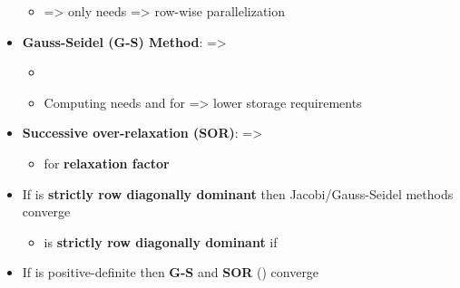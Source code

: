 \begin{itemize}
  \begin{itemize}
  
  \item
    =\textgreater{}  only needs
    =\textgreater{} row-wise parallelization
  \end{itemize}
\item
  \textbf{Gauss-Seidel (G-S) Method}: 
  =\textgreater{}

  \begin{itemize}
  
  \item
  \item
    Computing  needs
     and
     for  =\textgreater{}
    lower storage requirements
  \end{itemize}
\item
  \textbf{Successive over-relaxation (SOR)}:
   =\textgreater{}

  \begin{itemize}
  
  \item
    for \textbf{relaxation factor} \\
  \end{itemize}
\item
  If  is \textbf{strictly row diagonally dominant} then
  Jacobi/Gauss-Seidel methods converge

  \begin{itemize}
  
  \item
     is \textbf{strictly row diagonally dominant} if
  \end{itemize}
\item
  If  is positive-definite then \textbf{G-S} and \textbf{SOR}
  () converge
\end{itemize}

